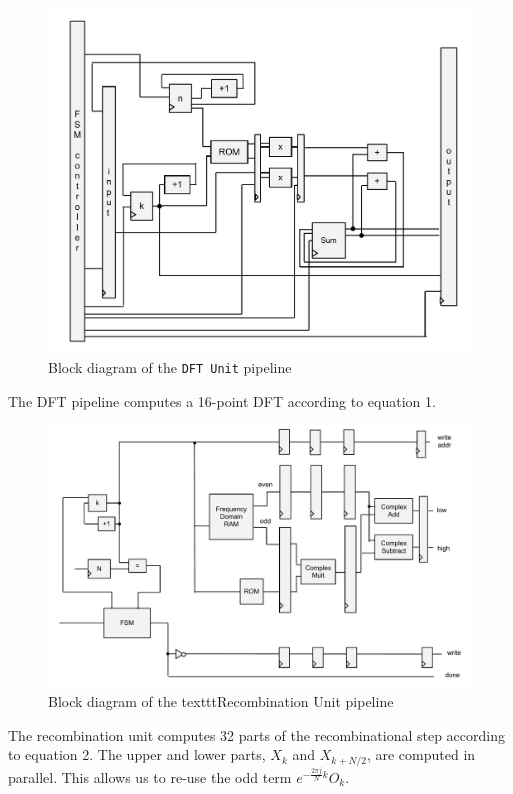 \documentclass{article}
\begin{document}
\begin{figure}[H]
	\centering
	\includegraphics[scale=0.3]{dft-unit}
	\caption{Block diagram of the \texttt{DFT Unit} pipeline}
\end{figure}

The DFT pipeline computes a 16-point DFT according to equation 1. 

\begin{figure}[H]
	\centering
	\includegraphics[scale=0.3]{recombinator}
	\caption{Block diagram of the texttt{Recombination Unit} pipeline}
\end{figure}

The recombination unit computes 32 parts of the recombinational step 
according to equation 2. The upper and lower parts, \(X_k\) and 
\(X_{k + N / 2}\), are computed in parallel. This allows us to re-use the 
odd term \(e^{-\frac{2\pi j}{N}k} O_k\).
\end{document}
